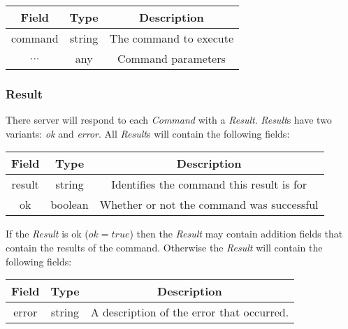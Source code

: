 \begin{table}[H]
    \begin{center}
        \begin{tabular}{|c|c|c|}\hline
            Field & Type & Description \\\hline
            command & string & The command to execute \\\hline
            $\ldots$ & any & Command parameters \\\hline
        \end{tabular}
    \end{center}
\end{table}

\subsubsection{Result}
\label{sec:message:result}

There server will respond to each \emph{Command} with a \emph{Result}. \emph{Result}s have two 
variants: \emph{ok} and \emph{error}. All \emph{Result}s will contain the following fields:

\begin{table}[H]
    \begin{center}
        \begin{tabular}{|c|c|c|}\hline
            Field & Type & Description \\\hline
            result & string & Identifies the command this result is for \\\hline
            ok & boolean & Whether or not the command was successful \\\hline
        \end{tabular}
    \end{center}
\end{table}

If the \emph{Result} is ok ($ok = true$) then the \emph{Result} may contain addition fields
that contain the results of the command. Otherwise the \emph{Result} will contain the following fields:

\begin{table}[H]
    \begin{center}
        \begin{tabular}{|c|c|c|}\hline
            Field & Type & Description \\\hline
            error & string & A description of the error that occurred. \\\hline
        \end{tabular}
    \end{center}
\end{table}

